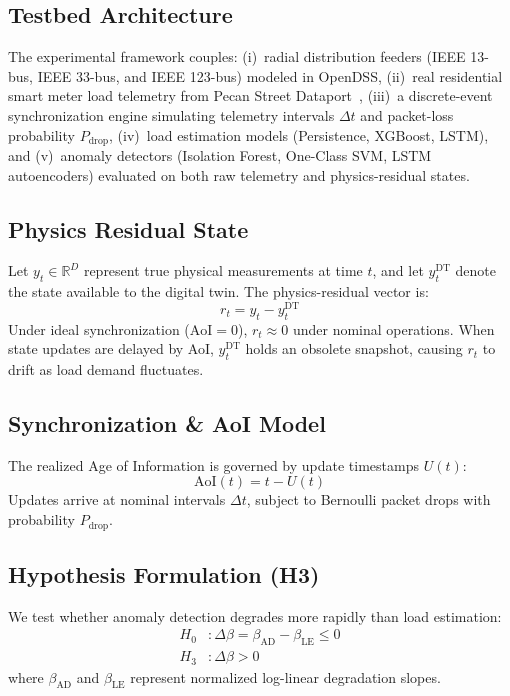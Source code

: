 \documentclass[journal]{IEEEtran}
\newcommand{\dtsync}{\Delta t}
\newcommand{\pdrop}{P_{\mathrm{drop}}}
\newcommand{\aoi}{\mathrm{AoI}}
\newcommand{\dbeta}{\Delta\beta}
\begin{document}
\subsection{Testbed Architecture}
The experimental framework couples:
(i)~radial distribution feeders (IEEE 13-bus, IEEE 33-bus, and IEEE 123-bus) modeled in OpenDSS,
(ii)~real residential smart meter load telemetry from Pecan Street Dataport~\cite{ref_pecan_street},
(iii)~a discrete-event synchronization engine simulating telemetry intervals $\dtsync$ and packet-loss probability $\pdrop$,
(iv)~load estimation models (Persistence, XGBoost, LSTM), and
(v)~anomaly detectors (Isolation Forest, One-Class SVM, LSTM autoencoders) evaluated on both raw telemetry and physics-residual states.

\subsection{Physics Residual State}
Let $y_t \in \mathbb{R}^D$ represent true physical measurements at time $t$, and let $y_t^{\mathrm{DT}}$ denote the state available to the digital twin. The physics-residual vector is:
\begin{equation}
    r_t = y_t - y_t^{\mathrm{DT}}
    \label{eq:residual}
\end{equation}
Under ideal synchronization ($\aoi = 0$), $r_t \approx 0$ under nominal operations. When state updates are delayed by AoI, $y_t^{\mathrm{DT}}$ holds an obsolete snapshot, causing $r_t$ to drift as load demand fluctuates.

\subsection{Synchronization & AoI Model}
The realized Age of Information is governed by update timestamps $U(t)$:
\begin{equation}
    \aoi(t) = t - U(t)
    \label{eq:aoi}
\end{equation}
Updates arrive at nominal intervals $\dtsync$, subject to Bernoulli packet drops with probability $\pdrop$.

\subsection{Hypothesis Formulation (H3)}
We test whether anomaly detection degrades more rapidly than load estimation:
\begin{align}
    H_0 &: \dbeta = \beta_{\mathrm{AD}} - \beta_{\mathrm{LE}} \leq 0 \\
    H_3 &: \dbeta > 0
\end{align}
where $\beta_{\mathrm{AD}}$ and $\beta_{\mathrm{LE}}$ represent normalized log-linear degradation slopes.
\end{document}
